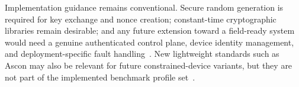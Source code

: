Implementation guidance remains conventional. Secure random generation is required for key exchange and nonce creation; constant-time cryptographic libraries remain desirable; and any future extension toward a field-ready system would need a genuine authenticated control plane, device identity management, and deployment-specific fault handling~\cite{chenSecuringEmergentBehaviour2021}. New lightweight standards such as Ascon may also be relevant for future constrained-device variants, but they are not part of the implemented benchmark profile set~\cite{nistSP800232Ascon}.
